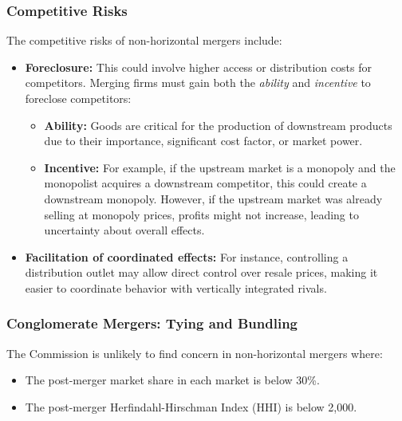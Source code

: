         \subsubsection{Competitive Risks}
            The competitive risks of non-horizontal mergers include:
            \begin{itemize}
                \item \textbf{Foreclosure:} This could involve higher access or distribution costs for competitors. Merging firms must gain both the \textit{ability} and \textit{incentive} to foreclose competitors:
                \begin{itemize}
                    \item \textbf{Ability:} Goods are critical for the production of downstream products due to their importance, significant cost factor, or market power.
                    \item \textbf{Incentive:} For example, if the upstream market is a monopoly and the monopolist acquires a downstream competitor, this could create a downstream monopoly. However, if the upstream market was already selling at monopoly prices, profits might not increase, leading to uncertainty about overall effects.
                \end{itemize}
                \item \textbf{Facilitation of coordinated effects:} For instance, controlling a distribution outlet may allow direct control over resale prices, making it easier to coordinate behavior with vertically integrated rivals.
            \end{itemize}


        \subsubsection{Conglomerate Mergers: Tying and Bundling}
            
            The Commission is unlikely to find concern in non-horizontal mergers where:
            \begin{itemize}
                \item The post-merger market share in each market is below 30\%.
                \item The post-merger Herfindahl-Hirschman Index (HHI) is below 2,000.
            \end{itemize}

